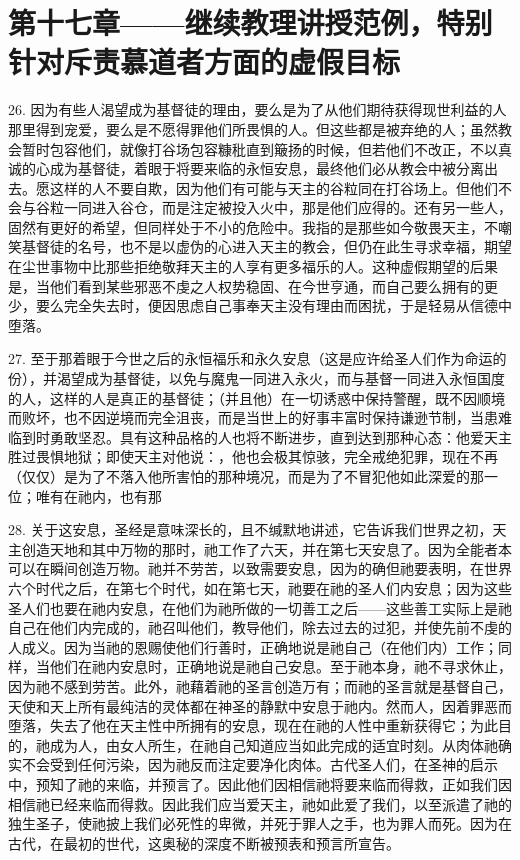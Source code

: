 
\section{第十七章——继续教理讲授范例，特别针对斥责慕道者方面的虚假目标}

26. 因为有些人渴望成为基督徒的理由，要么是为了从他们期待获得现世利益的人那里得到宠爱，要么是不愿得罪他们所畏惧的人。但这些都是被弃绝的人；虽然教会暂时包容他们，就像打谷场包容糠秕直到簸扬的时候，但若他们不改正，不以真诚的心成为基督徒，着眼于将要来临的永恒安息，最终他们必从教会中被分离出去。愿这样的人不要自欺，因为他们有可能与天主的谷粒同在打谷场上。但他们不会与谷粒一同进入谷仓，而是注定被投入火中，那是他们应得的。还有另一些人，固然有更好的希望，但同样处于不小的危险中。我指的是那些如今敬畏天主，不嘲笑基督徒的名号，也不是以虚伪的心进入天主的教会，但仍在此生寻求幸福，期望在尘世事物中比那些拒绝敬拜天主的人享有更多福乐的人。这种虚假期望的后果是，当他们看到某些邪恶不虔之人权势稳固、在今世亨通，而自己要么拥有的更少，要么完全失去时，便因思虑自己事奉天主没有理由而困扰，于是轻易从信德中堕落。\par

27. 至于那着眼于今世之后的永恒福乐和永久安息（这是应许给圣人们作为命运的份），并渴望成为基督徒，以免与魔鬼一同进入永火，而与基督一同进入永恒国度的人，这样的人是真正的基督徒；（并且他）在一切诱惑中保持警醒，既不因顺境而败坏，也不因逆境而完全沮丧，而是当世上的好事丰富时保持谦逊节制，当患难临到时勇敢坚忍。具有这种品格的人也将不断进步，直到达到那种心态：他爱天主胜过畏惧地狱；即使天主对他说：，他也会极其惊骇，完全戒绝犯罪，现在不再（仅仅）是为了不落入他所害怕的那种境况，而是为了不冒犯他如此深爱的那一位；唯有在祂内，也有那\par

28. 关于这安息，圣经是意味深长的，且不缄默地讲述，它告诉我们世界之初，天主创造天地和其中万物的那时，祂工作了六天，并在第七天安息了。因为全能者本可以在瞬间创造万物。祂并不劳苦，以致需要安息，因为的确但祂要表明，在世界六个时代之后，在第七个时代，如在第七天，祂要在祂的圣人们内安息；因为这些圣人们也要在祂内安息，在他们为祂所做的一切善工之后——这些善工实际上是祂自己在他们内完成的，祂召叫他们，教导他们，除去过去的过犯，并使先前不虔的人成义。因为当祂的恩赐使他们行善时，正确地说是祂自己（在他们内）工作；同样，当他们在祂内安息时，正确地说是祂自己安息。至于祂本身，祂不寻求休止，因为祂不感到劳苦。此外，祂藉着祂的圣言创造万有；而祂的圣言就是基督自己，天使和天上所有最纯洁的灵体都在神圣的静默中安息于祂内。然而人，因着罪恶而堕落，失去了他在天主性中所拥有的安息，现在在祂的人性中重新获得它；为此目的，祂成为人，由女人所生，在祂自己知道应当如此完成的适宜时刻。从肉体祂确实不会受到任何污染，因为祂反而注定要净化肉体。古代圣人们，在圣神的启示中，预知了祂的来临，并预言了。因此他们因相信祂将要来临而得救，正如我们因相信祂已经来临而得救。因此我们应当爱天主，祂如此爱了我们，以至派遣了祂的独生圣子，使祂披上我们必死性的卑微，并死于罪人之手，也为罪人而死。因为在古代，在最初的世代，这奥秘的深度不断被预表和预言所宣告。\par

